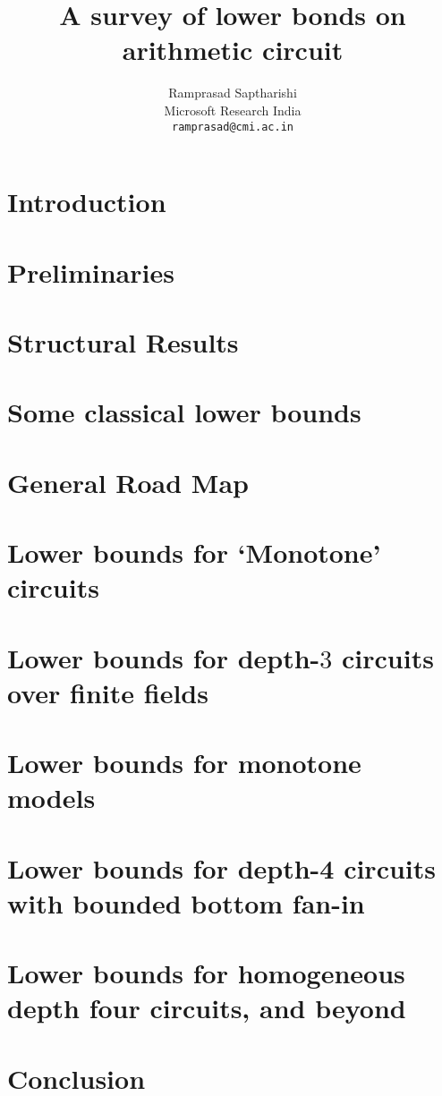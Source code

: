 \documentclass[12pt]{report}
\begin{document}
\title{A survey of lower bonds on arithmetic circuit}
\author{Ramprasad Saptharishi\\Microsoft Research India\\
{\tt ramprasad@cmi.ac.in}}
\maketitle 

\begin{abstract}
\lipsum[1-2]
\end{abstract}

\tableofcontents

\chapter{Introduction}

\lipsum

\chapter{Preliminaries}

\chapter{Structural Results}

\chapter{Some classical lower bounds}

\chapter{General Road Map}

\chapter{Lower bounds for `Monotone' circuits}

\chapter{Lower bounds for depth-$3$ circuits over finite fields}

\chapter{Lower bounds for monotone models}

\chapter{Lower bounds for depth-4 circuits with bounded bottom fan-in}

\chapter{Lower bounds for homogeneous depth four circuits, and beyond}

\chapter{Conclusion}




\end{document}
